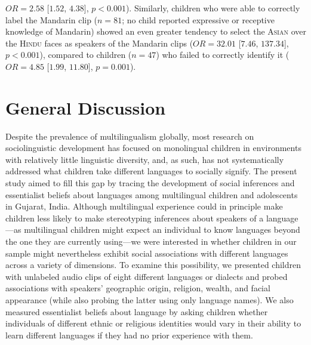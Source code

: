 \documentclass{foushee-adapted-preprint}
\begin{document}
$OR=2.58$ [$1.52$, $4.38$], $p<0.001$). 
Similarly, children who were able to correctly label the Mandarin clip ($n=81$; no child reported expressive or receptive knowledge of Mandarin) showed an even greater tendency to select the \textsc{Asian} over the \textsc{Hindu} faces as speakers of the Mandarin clips ($OR=32.01$ [$7.46$, $137.34$], $p<0.001$), compared to children ($n=47$) who failed to correctly identify it ($OR=4.85$ [$1.99$, $11.80$], $p=0.001$). 
\section{General Discussion}

Despite the prevalence of multilingualism globally, most research on sociolinguistic development has focused on monolingual children in environments with relatively little linguistic diversity, and, as such, has not systematically addressed what children take different languages to socially signify. 
The present study aimed to fill this gap by tracing the development of social inferences and essentialist beliefs about languages among multilingual children and adolescents in Gujarat, India. 
Although multilingual experience could in principle make children less likely to make stereotyping inferences about speakers of a language---as multilingual children might expect an individual to know languages beyond the one they are currently using---we were interested in whether children in our sample might nevertheless exhibit social associations with different languages across a variety of dimensions. To examine this possibility, we presented children with unlabeled audio clips of eight different languages or dialects and probed associations with speakers' geographic origin, religion, wealth, and facial appearance (while also probing the latter using only language names). 
We also measured essentialist beliefs about language by asking children whether individuals of different ethnic or religious identities would vary in their ability to learn different languages if they had no prior experience with them.
\end{document}
